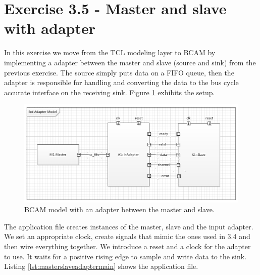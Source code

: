 \section{Exercise 3.5 - Master and slave with adapter}

In this exercise we move from the TCL modeling layer to BCAM by implementing a adapter between the master and slave (source and sink) from the previous exercise. The source simply puts data on a FIFO queue, then the adapter is responsible for handling and converting the data to the bus cycle accurate interface on the receiving sink. Figure \ref{fig:masterslaveadapter} exhibits the setup.

\begin{figure}[h]
	\centering
	\includegraphics[width=1\linewidth]{MasterSlaveAdapter.png}
	\caption{BCAM model with an adapter between the master and slave.}
	\label{fig:masterslaveadapter}
\end{figure}
\newpage
\noindent The application file creates instances of the master, slave and the input adapter. We set an appropriate clock, create signals that mimic the ones used in 3.4 and then wire everything together. We introduce a reset and a clock for the adapter to use. It waits for a positive rising edge to sample and write data to the sink. Listing \ref{lst:masterslaveadaptermain} shows the application file.

